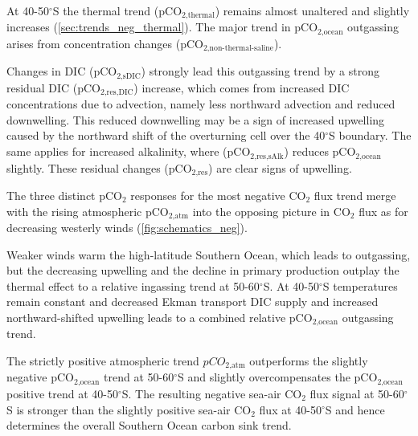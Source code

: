 At 40-50$^\circ$S the thermal trend (pCO$_{\text{2,thermal}}$) remains almost unaltered and slightly increases (\autoref{sec:trends_neg_thermal}). The major trend in pCO$_{\text{2,ocean}}$ outgassing arises from concentration changes (pCO$_{\text{2,non-thermal-saline}}$). 

Changes in \acs{DIC} (pCO$_{\text{2,sDIC}}$) strongly lead this outgassing trend by a strong residual \acs{DIC} (pCO$_{\text{2,res,DIC}}$) increase, which comes from increased \acs{DIC} concentrations due to advection, namely less northward advection and reduced downwelling. This reduced downwelling may be a sign of increased upwelling caused by the northward shift of the overturning cell over the 40$^\circ$S boundary. The same applies for increased alkalinity, where (pCO$_{\text{2,res,sAlk}}$) reduces pCO$_{\text{2,ocean}}$ slightly. These residual changes (pCO$_{\text{2,res}}$) are clear signs of upwelling.\newline


\label{sec:pCO2separation_neg}
The three distinct pCO$_2$ responses for the most negative CO$_2$ flux trend merge with the rising atmospheric pCO$_{\text{2,atm}}$ into the opposing picture in CO$_2$ flux as for decreasing westerly winds (\autoref{fig:schematics_neg}). 

Weaker winds warm the high-latitude Southern Ocean, which leads to outgassing, but the decreasing upwelling and the decline in primary production outplay the thermal effect to a relative ingassing trend at 50-60$^\circ$S. At 40-50$^\circ$S temperatures remain constant and decreased Ekman transport \acs{DIC} supply and increased northward-shifted upwelling leads to a combined relative pCO$_{\text{2,ocean}}$ outgassing trend. 

The strictly positive atmospheric trend $pCO_{\text{2,atm}}$ outperforms the slightly negative pCO$_{\text{2,ocean}}$ trend at 50-60$^\circ$S and slightly overcompensates the pCO$_{\text{2,ocean}}$ positive trend at 40-50$^\circ$S. The resulting negative sea-air CO$_2$ flux signal at 50-60$^\circ$S is stronger than the slightly positive sea-air CO$_2$ flux at 40-50$^\circ$S and hence determines the overall Southern Ocean carbon sink trend.\newline


